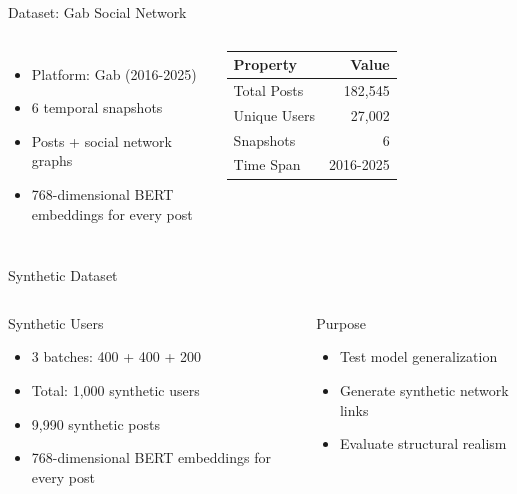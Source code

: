 \documentclass[aspectratio=169,xcolor=dvipsnames]{beamer}
\begin{document}
\begin{frame}{Dataset: Gab Social Network }
	\begin{columns}[c]
		\begin{itemize}
			\item Platform: Gab (2016-2025)
			\item 6 temporal snapshots
			\item Posts + social network graphs
			\item 768-dimensional BERT embeddings for every post
		\end{itemize}

		\begin{table}
			\footnotesize
			\begin{tabular}{lr}
				\toprule
				\textbf{Property} & \textbf{Value} \\
				\midrule
				Total Posts       & 182,545        \\
				Unique Users      & 27,002         \\
				Snapshots         & 6              \\
				Time Span         & 2016-2025      \\
				\bottomrule
			\end{tabular}
		\end{table}
	\end{columns}
\end{frame}

\begin{frame}{Synthetic Dataset }
	\begin{columns}[c]
		\begin{block}{Synthetic Users}
			\begin{itemize}
				\item 3 batches: 400 + 400 + 200
				\item Total: 1,000 synthetic users
				\item 9,990 synthetic posts
				\item 768-dimensional BERT embeddings for every post
			\end{itemize}
		\end{block}

		\begin{alertblock}{Purpose}
			\begin{itemize}
				\item Test model generalization
				\item Generate synthetic network links
				\item Evaluate structural realism
			\end{itemize}
		\end{alertblock}
	\end{columns}

	\vspace{0.5em}
	\centering
	\footnotesize
\end{frame}
\end{document}
